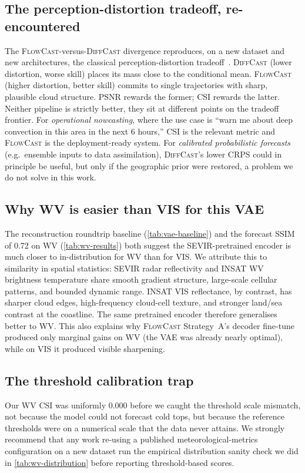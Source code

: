\documentclass[11pt,a4paper]{article}
\begin{document}
\subsection{The perception-distortion tradeoff, re-encountered}
\label{sec:perception-dist}
The \textsc{FlowCast}-versus-\textsc{DiffCast} divergence reproduces, on a
new dataset and new architectures, the classical perception-distortion
tradeoff~\citep{blau2018perception}. \textsc{DiffCast} (lower distortion,
worse skill) places its mass close to the conditional mean. \textsc{FlowCast}
(higher distortion, better skill) commits to single trajectories with
sharp, plausible cloud structure. PSNR rewards the former; CSI rewards the
latter. Neither pipeline is strictly better, they sit at different points
on the tradeoff frontier. For \emph{operational nowcasting}, where the use
case is ``warn me about deep convection in this area in the next 6 hours,''
CSI is the relevant metric and \textsc{FlowCast} is the deployment-ready
system. For \emph{calibrated probabilistic forecasts} (e.g.\ ensemble
inputs to data assimilation), \textsc{DiffCast}'s lower CRPS could in
principle be useful, but only if the geographic prior were restored, a
problem we do not solve in this work.

\subsection{Why WV is easier than VIS for this VAE}
\label{sec:wv-discuss}
The reconstruction roundtrip baseline (\cref{tab:vae-baseline}) and the
forecast SSIM of 0.72 on WV (\cref{tab:wv-results}) both suggest the
{SEVIR}-pretrained encoder is much closer to in-distribution for WV than
for VIS. We attribute this to similarity in spatial statistics: SEVIR
radar reflectivity and INSAT WV brightness temperature share smooth
gradient structure, large-scale cellular patterns, and bounded dynamic
range. INSAT VIS reflectance, by contrast, has sharper cloud edges,
high-frequency cloud-cell texture, and stronger land/sea contrast at the
coastline. The same pretrained encoder therefore generalises better to WV.
This also explains why \textsc{FlowCast} Strategy~A's decoder fine-tune
produced only marginal gains on WV (the VAE was already nearly optimal),
while on VIS it produced visible sharpening.

\subsection{The threshold calibration trap}
\label{sec:thresh-discuss}
Our WV CSI was uniformly 0.000 before we caught the threshold scale
mismatch, not because the model could not forecast cold tops, but because
the reference thresholds were on a numerical scale that the data never
attains. We strongly recommend that any work re-using a published
meteorological-metrics configuration on a new dataset run the empirical
distribution sanity check we did in \cref{tab:wv-distribution} before
reporting threshold-based scores.
\end{document}

